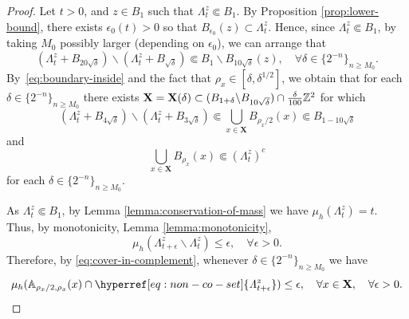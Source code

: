 \documentclass[12pt]{amsart}
\numberwithin{equation}{section}
\newcommand{\cluster}[2]{\hyperref[eq:non-co-set]{\mathit{\Lambda}^{#1}_{#2}}}
\begin{document}
\begin{proof}
		
		Let $t > 0$, and $z \in B_1$ such that ${\cluster{z}{t}} \Subset B_1$. By Proposition \ref{prop:lower-bound}, there exists $\epsilon_0(t) > 0$ so that $B_{\epsilon_0}(z) \subset {\cluster{z}{t}}$.
		Hence, since ${\cluster{z}{t}} \Subset B_1$, by taking $M_0$ possibly larger (depending on $\epsilon_0$), we can arrange that
		\begin{equation} \label{eq:boundary-inside}
		({\cluster{z}{t}} + B_{20 \sqrt{\delta }}) \backslash ({\cluster{z}{t}} + B_{\sqrt{\delta }}) \Subset  B_1 \backslash B_{10 \sqrt{\delta }}(z), \quad \forall \delta  \in \{2^{-n}\}_{n \geq M_0} .
		\end{equation}
		By~\eqref{eq:boundary-inside} and the fact that $\rho_x \in [\delta , \delta^{1/2}]$, we obtain that for each $\delta  \in \{2^{-n}\}_{n \geq M_0}$ there exists $\mathbf{X} = \mathbf{X}(\delta) \subset (B_{1 + \delta } \backslash B_{10 \sqrt{\delta }})  \cap \frac{\delta }{100} \mathbb{Z}^2$ for which
		\begin{equation} \label{eq:cover-continuous}
		({\cluster{z}{t}} + B_{4 \sqrt{\delta }}) \backslash ({\cluster{z}{t}} + B_{3 \sqrt{\delta }}) \Subset \bigcup_{x \in \mathbf{X}} B_{\rho_x/2}(x ) \Subset B_{1- 10 \sqrt{\delta}}
		\end{equation}
		and 
		\begin{equation} \label{eq:cover-in-complement}
		\bigcup_{x \in \mathbf{X}} B_{\rho_x}(x) \Subset ({{{\cluster{z}{t}}}})^c
		\end{equation}
		for each $\delta  \in \{2^{-n}\}_{n \geq M_0}$.
		
		
		As ${\cluster{z}{t}} \Subset B_1$, by Lemma \ref{lemma:conservation-of-mass} we have $\mu_h({\cluster{z}{t}}) = t$.
		Thus, by monotonicity, Lemma \ref{lemma:monotonicity}, 
		\[
		\mu_h({\cluster{z}{t + \epsilon}} \backslash {\cluster{z}{t}}) \leq \epsilon, \quad \forall \epsilon > 0.
		\] 
		Therefore, by \eqref{eq:cover-in-complement}, whenever $\delta  \in \{2^{-n}\}_{n \geq M_0}$ we have
		\begin{equation} \label{eq:expand-cluster-mass}
		\mu_h(\A_{\rho_x/2,\rho_x}(x ) \cap {\cluster{z}{t+\epsilon}}) \leq \epsilon, \quad \forall x \in \mathbf{X}, \quad \forall \epsilon > 0.
		\end{equation}
		

\end{proof}
\end{document}
